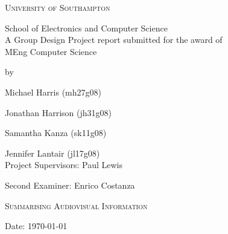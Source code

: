 
\begin{titlepage}
	
\begin{center}

\textsc{\large{University of Southampton}}

\large{School of Electronics and Computer Science}\\[3cm]

\large{A Group Design Project report submitted for the award of}\\[0.0cm]
\large{MEng Computer Science}

\large{by}

\large{Michael Harris (mh27g08)}

\large{Jonathan Harrison (jh31g08)}

\large{Samantha Kanza (sk11g08)}

\large{Jennifer Lantair (jl17g08)}\\[3cm]


\large{Project Supervisors: Paul Lewis}

\large{Second Examiner: Enrico Costanza}

\vfill

\textsc{\LARGE Summarising Audiovisual Information}

\large{Date: \today}\\[4.0cm]


\end{center}

\end{titlepage}
